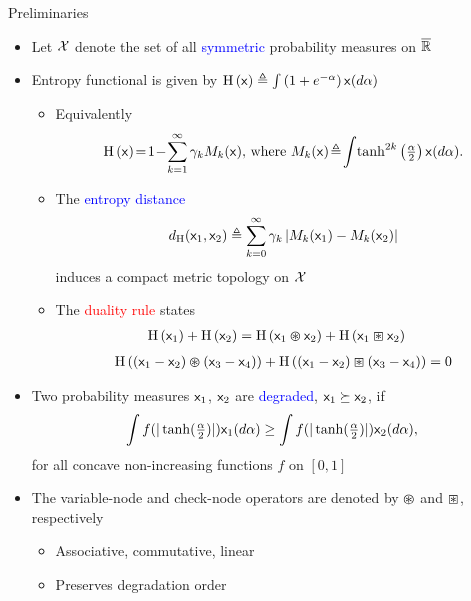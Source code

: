 \documentclass{beamer}
\newlength{\onecolwid}
\begin{document}
\begin{columns}[t]
\begin{column}{\onecolwid}
\begin{block}{\Large Preliminaries}
  \begin{itemize}
  \item Let $\mathcal{X}$ denote the set of all \textcolor{blue}{symmetric} probability measures on $\overline{\mathbb{R}}$
  \item Entropy functional is given by $\mathrm{H} \left( \mathsf{x} \right) \triangleq \int \left( 1+e^{-\alpha} \right) \mathsf{x}(d\alpha)$
    \begin{itemize}
    \item Equivalently
      \begin{align*}
        \mathrm{H} \left( \mathsf{x} \right) \!=\! 1 \!-\! \sum_{k=1}^{\infty} \gamma_k M_{k}(\mathsf{x}) ,\, \text{where $M_{k}(\mathsf{x}) \!\triangleq\! \int  \!\tanh^{2k} \left( \tfrac{\alpha}{2} \right) \mathsf{x}(d\alpha)$.}
      \end{align*}
    \item  The \textcolor{blue}{entropy distance}
      \begin{align*}
        d_{\mathrm{H}}(\mathsf{x}_1,\mathsf{x}_2) \triangleq \sum_{k=0}^{\infty} \gamma_k \left\lvert M_k(\mathsf{x}_1) - M_k(\mathsf{x}_2)\right\rvert
      \end{align*}
      induces a compact metric topology on $\mathcal{X}$
    \item The \textcolor{red}{duality rule} states
      \begin{align*}
        \mathrm{H} \left( \mathsf{x}_1 \right) + \mathrm{H} \left( \mathsf{x}_2 \right) &= \mathrm{H} \left( \mathsf{x}_1 \varoast \mathsf{x}_2 \right) + \mathrm{H} \left( \mathsf{x}_1 \boxast \mathsf{x}_2 \right)
      \end{align*}
      \begin{align*}
        \mathrm{H} \left( (\mathsf{x}_1 - \mathsf{x}_2) \varoast (\mathsf{x}_3 - \mathsf{x}_4)  \right) + \mathrm{H} \left( (\mathsf{x}_1 - \mathsf{x}_2) \boxast (\mathsf{x}_3 - \mathsf{x}_4)  \right) = 0
      \end{align*}
    \end{itemize}
    
  \item Two probability measures $\mathsf{x}_1$, $\mathsf{x}_2$ are \textcolor{blue}{degraded}, $\mathsf{x}_1 \succeq \mathsf{x}_2$, if
    \begin{align*}
      \int f(|\tanh(\tfrac{\alpha}{2})|) \mathsf{x}_1 (d\alpha) \geq \int f(|\tanh(\tfrac{\alpha}{2})|) \mathsf{x}_2 (d\alpha) ,
    \end{align*}
    for all concave non-increasing functions $f$ on $[0,1]$
    \vspace{1cm}
  \item The variable-node and check-node operators are denoted by $\varoast$ and $\boxast$, respectively
    \begin{itemize}
      \vspace{0.5cm} \item Associative, commutative, linear
      \vspace{0.5cm} \item Preserves degradation order
    \end{itemize}
    

\end{itemize}
\end{block}
\end{column}
\end{columns}
\end{document}
